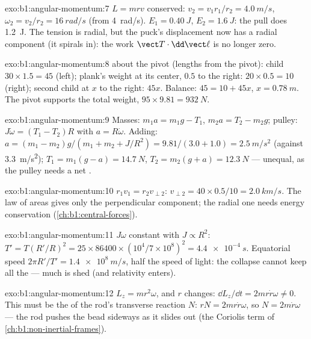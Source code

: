 \begin{solution}{exo:b1:angular-momentum:7}
$L = mrv$ conserved: $v_2 = v_1r_1/r_2 = \qty{4.0}{m/s}$, $\omega_2 = v_2/r_2
= \qty{16}{rad/s}$ (from \qty{4}{rad/s}). $E_1 = \qty{0.40}{J}$, $E_2 =
\qty{1.6}{J}$: the pull does \qty{1.2}{J}. The tension is radial, but the
puck's displacement now has a radial component (it spirals in): the work
$\vect T\cdot\dd\vect\ell$ is no longer zero.
\end{solution}

\begin{solution}{exo:b1:angular-momentum:8}
 about the pivot (lengths from the pivot): child $30 \times 1.5 =
45$ (left); plank's weight at its center, $0.5$ to the right: $20 \times
0.5 = 10$ (right); second child at $x$ to the right: $45x$. Balance:
$45 = 10 + 45x$, $x = \qty{0.78}{m}$. The pivot supports the total weight,
$95 \times 9.81 = \qty{932}{N}$.
\end{solution}

\begin{solution}{exo:b1:angular-momentum:9}
Masses: $m_1a = m_1g - T_1$, $m_2a = T_2 - m_2g$; pulley: $J\dot\omega =
(T_1 - T_2)R$ with $a = R\dot\omega$. Adding: $a = (m_1 - m_2)g/(m_1 + m_2 +
J/R^2) = 9.81/(3.0 + 1.0) = \qty{2.5}{m/s^2}$ (against \qty{3.3}{m/s^2});
$T_1 = m_1(g - a) = \qty{14.7}{N}$, $T_2 = m_2(g + a) = \qty{12.3}{N}$ ---
unequal, as the pulley needs a net .
\end{solution}

\begin{solution}{exo:b1:angular-momentum:10}
$r_1v_1 = r_2v_{\perp 2}$: $v_{\perp 2} = 40 \times 0.5/10 = \qty{2.0}{km/s}$.
The law of areas gives only the perpendicular component; the radial one
needs energy conservation (\cref{ch:b1:central-forces}).
\end{solution}

\begin{solution}{exo:b1:angular-momentum:11}
$J\omega$ constant with $J \propto R^2$: $T' = T(R'/R)^2 = 25 \times 86400
\times (10^4/7\times10^8)^2 = \qty{4.4e-4}{s}$. Equatorial speed $2\pi R'/T'
= \qty{1.4e8}{m/s}$, half the speed of light: the collapse cannot keep
all the  --- much is shed (and relativity enters).
\end{solution}

\begin{solution}{exo:b1:angular-momentum:12}
$L_z = mr^2\omega$, and $r$ changes: $\dd L_z/\dd t = 2mr\dot r\omega \neq 0$.
This must be the  of the rod's transverse reaction $N$: $rN =
2mr\dot r\omega$, so $N = 2m\dot r\omega$ --- the rod pushes the bead sideways
as it slides out (the Coriolis term of \cref{ch:b1:non-inertial-frames}).
\end{solution}

